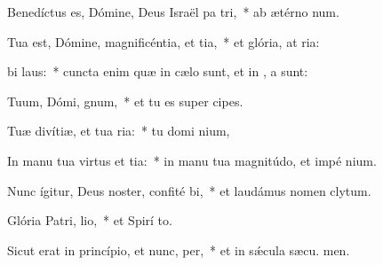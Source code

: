 \item Benedíctus es, Dómine, Deus Israël pa tri,~* ab ætérno  num.
\item Tua est, Dómine, magnificéntia, et tia,~* et glória, at ria:
\item {} bi laus:~* cuncta enim quæ in cælo sunt, et in , a sunt:
\item Tuum, Dómi, gnum,~* et tu es super  cipes.
\item Tuæ divítiæ, et tua  ria:~* tu domi nium,
\item In manu tua virtus et tia:~* in manu tua magnitúdo, et impé nium.
\item Nunc ígitur, Deus noster, confité bi,~* et laudámus nomen  clytum.
\item Glória Patri,  lio,~* et Spirí to.
\item Sicut erat in princípio, et nunc,  per,~* et in sǽcula sæcu. men.
